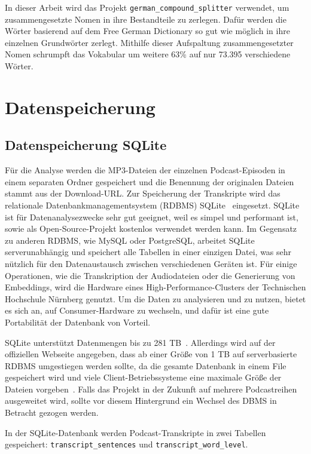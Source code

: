 In dieser Arbeit wird das Projekt \verb|german_compound_splitter|\cite{repodiac2023} verwendet, um zusammengesetzte Nomen in ihre Bestandteile zu zerlegen. 
Dafür werden die Wörter basierend auf dem Free German Dictionary\cite{2021} so gut wie möglich in ihre einzelnen Grundwörter zerlegt. 
Mithilfe dieser Aufspaltung zusammengesetzter Nomen schrumpft das Vokabular um weitere 63\% auf nur 73.395 verschiedene Wörter.


\section{Datenspeicherung}

\subsection{Datenspeicherung SQLite}

Für die Analyse werden die MP3-Dateien der einzelnen Podcast-Episoden in einem separaten Ordner gespeichert und die Benennung der originalen Dateien stammt aus der Download-URL.
Zur Speicherung der Transkripte wird das relationale Datenbankmanagementsystem (RDBMS) SQLite~\cite{zotero-553} eingesetzt. 
SQLite ist für Datenanalysezwecke sehr gut geeignet, weil es simpel und performant ist, sowie als Open-Source-Projekt kostenlos verwendet werden kann.
Im Gegensatz zu anderen RDBMS, wie MySQL oder PostgreSQL, arbeitet SQLite serverunabhängig und speichert alle Tabellen in einer einzigen Datei, was sehr nützlich für den Datenaustausch zwischen verschiedenen Geräten ist.
Für einige Operationen, wie die Transkription der Audiodateien oder die Generierung von Embeddings, wird die Hardware eines High-Performance-Clusters der Technischen Hochschule Nürnberg genutzt.
Um die Daten zu analysieren und zu nutzen, bietet es sich an, auf Consumer-Hardware zu wechseln, und dafür ist eine gute Portabilität der Datenbank von Vorteil.

SQLite unterstützt Datenmengen bis zu 281 TB~\cite{zotero-553}.
Allerdings wird auf der offiziellen Webseite angegeben, dass ab einer Größe von 1 TB auf serverbasierte RDBMS umgestiegen werden sollte, da die gesamte Datenbank in einem File gespeichert wird und viele Client-Betriebssysteme eine maximale Größe der Dateien vorgeben~\cite{zotero-553}.
Falls das Projekt in der Zukunft auf mehrere Podcastreihen ausgeweitet wird, sollte vor diesem Hintergrund ein Wechsel des DBMS in Betracht gezogen werden.

In der SQLite-Datenbank werden Podcast-Transkripte in zwei Tabellen gespeichert: \texttt{transcript\_sentences} und \texttt{transcript\_word\_level}.

